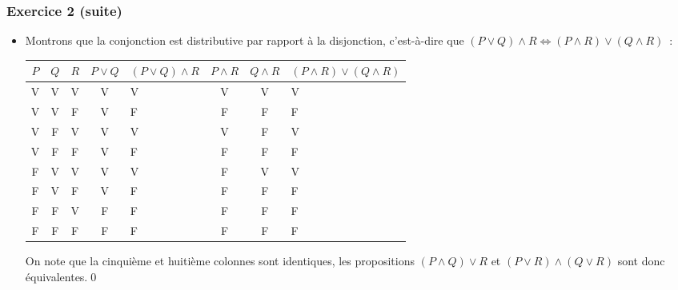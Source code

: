 \documentclass[10pt,notheorems]{beamer}
\theoremstyle{plain}
\theoremstyle{definition} %
\begin{document}
\begin{frame}
  \frametitle{Exercice 2 (suite)}
  \fontsize{8}{10}\selectfont

  \begin{itemize}
    
  \item Montrons que la conjonction est distributive par rapport à la disjonction, c'est-à-dire que $(P\lor Q)\land R \Leftrightarrow (P\land R) \lor (Q\land R)$~:\newline
  \begin{table}[H]
    \centering
    \begin{tabular}[H]{|ccc|cgccg|}
      \hline
      $P$ & $Q$ & $R$ & $P\lor Q$ & $(P\lor Q)\land R$ & $P\land R$ & $Q \land R$ & $(P\land R)\lor (Q \land R)$ \\ \hline
      V & V & V & V & V & V & V & V \\
      V & V & F & V & F & F & F & F \\
      V & F & V & V & V & V & F & V \\
      V & F & F & V & F & F & F & F \\
      F & V & V & V & V & F & V & V \\
      F & V & F & V & F & F & F & F \\
      F & F & V & F & F & F & F & F \\
      F & F & F & F & F & F & F & F \\
      \hline\hline
    \end{tabular}
  \end{table}

  \bigskip

  On note que la cinquième et huitième colonnes sont identiques, les propositions $(P\land Q)\lor R$ et $(P\lor R) \land (Q\lor R)$ sont donc équivalentes.\qed 
    
  \end{itemize}
  
\end{frame}
\end{document}
